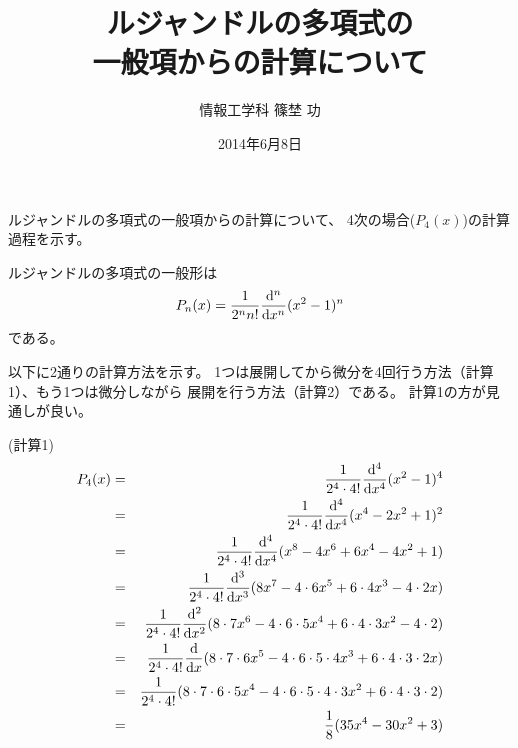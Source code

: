 \documentclass[a4j,12pt]{jarticle}
\title{ルジャンドルの多項式の\\一般項からの計算について}
\date{2014年6月8日}
\author{情報工学科 \quad 篠埜 功}
\begin{document}
\maketitle

ルジャンドルの多項式の一般項からの計算について、
4次の場合($P_4(x)$)の計算過程を示す。

ルジャンドルの多項式の一般形は
\[
P_n(x) = \frac{1}{2^n n!}\frac{{\rm d}^n}{{\rm d}x^n}(x^2-1)^n
\]
である。

以下に2通りの計算方法を示す。
1つは展開してから微分を4回行う方法（計算1）、もう1つは微分しながら
展開を行う方法（計算2）である。
計算1の方が見通しが良い。

(計算1)
\begin{eqnarray*}
P_4(x) &=& \frac{1}{2^4 \cdot 4!} \frac{{\rm d}^4}{{\rm d}x^4} (x^2 -1)^4\\
       &=& \frac{1}{2^4 \cdot 4!} \frac{{\rm d}^4}{{\rm d}x^4} (x^4 -2x^2 + 1)^2\\
       &=& \frac{1}{2^4 \cdot 4!} \frac{{\rm d}^4}{{\rm d}x^4} (x^8 - 4x^6 + 6x^4 -4x^2 +1)\\
       &=& \frac{1}{2^4 \cdot 4!} \frac{{\rm d}^3}{{\rm d}x^3} 
                  (8x^7 - 4 \cdot 6x^5 + 6 \cdot 4x^3 -4 \cdot 2 x)\\
       &=& \frac{1}{2^4 \cdot 4!} \frac{{\rm d}^2}{{\rm d}x^2} 
                  (8 \cdot 7x^6 - 4 \cdot 6 \cdot 5 x^4 + 6 \cdot 4 \cdot 3 x^2 -4 \cdot 2)\\
       &=& \frac{1}{2^4 \cdot 4!} \frac{{\rm d}}{{\rm d}x} 
                  (8 \cdot 7 \cdot 6 x^5 - 4 \cdot 6 \cdot 5 \cdot 4 x^3 + 6 \cdot 4 \cdot 3 \cdot 2 x)\\
       &=& \frac{1}{2^4 \cdot 4!} 
                  (8 \cdot 7 \cdot 6 \cdot 5 x^4 - 4 \cdot 6 \cdot 5 \cdot 4 \cdot 3 x^2 + 
                        6 \cdot 4 \cdot 3 \cdot 2)\\
       &=& \frac{1}{8}
                  (35x^4 - 30x^2 + 3)
\end{eqnarray*}
\end{document}
